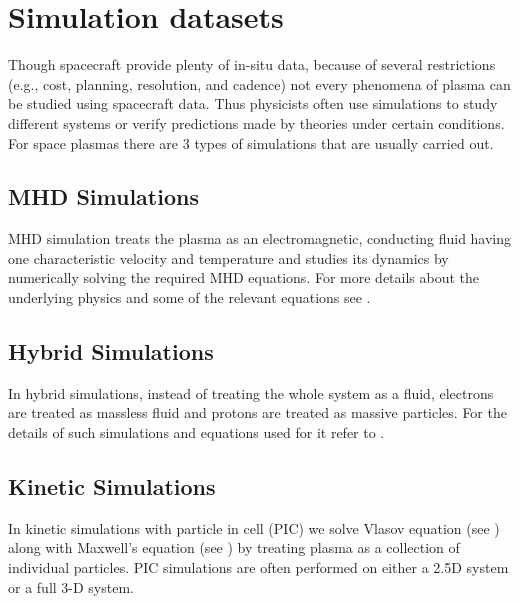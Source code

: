     \section{Simulation datasets}\label{sec:intr42}

        Though spacecraft provide plenty of in-situ data, because of several restrictions (e.g.,
        cost, planning, resolution, and cadence) not every phenomena of plasma can be studied using
        spacecraft data. Thus physicists often use simulations to study different systems or verify
        predictions made by theories under certain conditions. For space plasmas there are 3 types
        of simulations that are usually carried out.

        \subsection{MHD Simulations}\label{sec:mhd}

            MHD simulation treats the plasma as an electromagnetic, conducting fluid having one
            characteristic velocity and temperature and studies its dynamics by numerically solving
            the required MHD equations. For more details about the underlying physics and some of
            the relevant equations see \citep{Hossain1995}.

        \subsection{Hybrid Simulations}\label{sec:hybd}

            In hybrid simulations, instead of treating the whole system as a fluid, electrons are
            treated as massless fluid and protons are treated as massive particles. For the details
            of such simulations and equations used for it refer to \citep{Terasawa1986, Vasquez1995,
            Parashar2009}.

        \subsection{Kinetic Simulations}\label{sec:kntc}

            In kinetic simulations with particle in cell (PIC) we solve Vlasov equation (see
            ) along with Maxwell's equation (see )
            by treating plasma as a collection of individual particles. PIC simulations are often
            performed on either a 2.5D system or a full 3-D system.

